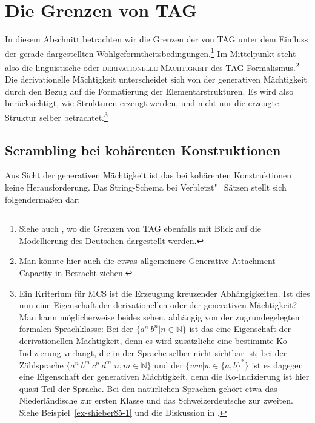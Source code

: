 \section{Die Grenzen von TAG} \label{sec-tag-grenzen}

In diesem Abschnitt betrachten wir die Grenzen der  von TAG unter dem Einfluss der gerade dargestellten Wohlgeformtheitsbedingungen.\footnote{Siehe auch \citet[Abschnitt~2.4]{Gerdes:02b}, wo die Grenzen von TAG ebenfalls mit Blick auf die Modellierung des Deutschen dargestellt werden.} Im Mittelpunkt steht also die linguistische oder \textsc{derivationelle Mächtigkeit}  \citep{Becker:Rambow:Niv:92} des TAG-Formalis\-mus.\footnote{Man könnte hier auch die etwas allgemeinere Generative Attachment Capacity \citep{Kallmeyer:06} in Betracht ziehen.} Die derivationelle Mächtigkeit unterscheidet sich von der generativen Mächtigkeit durch den Bezug auf die Formatierung der Elementarstrukturen. Es wird also berücksichtigt, wie Strukturen erzeugt werden, und nicht nur die erzeugte Struktur selber betrachtet.\footnote{Ein Kriterium für MCS ist die Erzeugung kreuzender Abhängigkeiten. Ist dies nun eine Eigenschaft der derivationellen oder der generativen Mächtigkeit? Man kann möglicherweise beides sehen, abhängig von der zugrundegelegten formalen Sprachklasse: Bei der  $\{a^n ~ b^n | n \in \mathbb{N}\}$ ist das eine Eigenschaft der derivationellen Mächtigkeit, denn es wird zusätzliche eine bestimmte Ko-Indizierung verlangt, die in der Sprache selber nicht sichtbar ist; bei der Zählsprache $\{a^n ~ b^m ~ c^n ~ d^m | n,m \in \mathbb{N}\}$ und der  $\{ww|w\in\{a,b\}^*\}$ ist es dagegen eine Eigenschaft der generativen Mächtigkeit, denn die Ko-Indizierung ist hier quasi Teil der Sprache. Bei den natürlichen Sprachen gehört etwa das Niederländische zur ersten Klasse und das Schweizerdeutsche zur zweiten. Siehe Beispiel~\ref{ex-shieber85-1} und die Diskussion in \cite{Shieber:85}.} 

\subsection{Scrambling bei kohärenten Konstruktionen} \label{sec-tag-grenzen-scram}

Aus Sicht der generativen Mächtigkeit ist das  bei kohärenten Konstruktionen keine Herausforderung. Das String-Schema bei Verbletzt"=Sätzen \linebreak stellt sich folgenderma\ss en dar:

